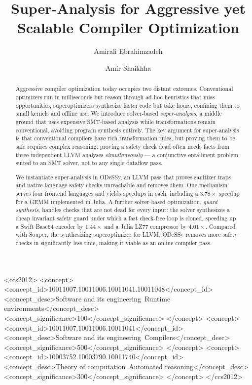 \documentclass[acmsmall,screen,nonacm]{acmart}
\newcommand{\odessy}{ODeSSy}
\newcommand{\tool}{\odessy}
\begin{document}
\title[Super-Analysis for Compiler Optimization]{Super-Analysis for Aggressive yet Scalable Compiler Optimization}
\author{Amirali Ebrahimzadeh}
\author{Amir Shaikhha}
\renewcommand{\shortauthors}{Ebrahimzadeh and Shaikhha}
\begin{abstract}
Aggressive compiler optimization today occupies two distant extremes.
Conventional optimizers run in milliseconds but reason through ad-hoc
heuristics that miss opportunities; superoptimizers synthesize faster code
but take hours, confining them to small kernels and offline use. We introduce
solver-based \emph{super-analysis}, a middle ground that uses expensive SMT-based analysis while transformations remain conventional, avoiding
program synthesis entirely. The key argument for super-analysis is that conventional compilers have rich transformation rules, but proving them to be safe requires complex reasoning: proving a safety check dead often needs facts from three
independent LLVM analyses \emph{simultaneously} --- a conjunctive entailment
problem suited to an SMT solver, not to any single dataflow pass.


We instantiate
super-analysis in \tool{}, an LLVM pass that proves sanitizer traps and
native-language safety checks unreachable and removes them.
One mechanism serves four frontend languages and yields speedups in each, including a $3.78\times$ speedup for a GEMM implemented in Julia.
A further solver-based optimization, \emph{guard synthesis}, handles
checks that are not dead for every input: the solver synthesizes a cheap invariant safety guard under which a fast check-free loop is cloned,
speeding up a Swift Base64 encoder by $1.44\times$ and a Julia LZ77
compressor by $4.01\times$. Compared with Souper, the synthesizing
superoptimizer for LLVM, \tool{} removes more safety checks in significantly less time, making it viable as an online compiler pass.
\end{abstract}
\begin{CCSXML}
<ccs2012>
 <concept>
  <concept_id>10011007.10011006.10011041.10011048</concept_id>
  <concept_desc>Software and its engineering~Runtime environments</concept_desc>
  <concept_significance>100</concept_significance>
 </concept>
 <concept>
  <concept_id>10011007.10011006.10011041</concept_id>
  <concept_desc>Software and its engineering~Compilers</concept_desc>
  <concept_significance>500</concept_significance>
 </concept>
 <concept>
  <concept_id>10003752.10003790.10011740</concept_id>
  <concept_desc>Theory of computation~Automated reasoning</concept_desc>
  <concept_significance>300</concept_significance>
 </concept>
</ccs2012>
\end{CCSXML}
\maketitle
\end{document}
